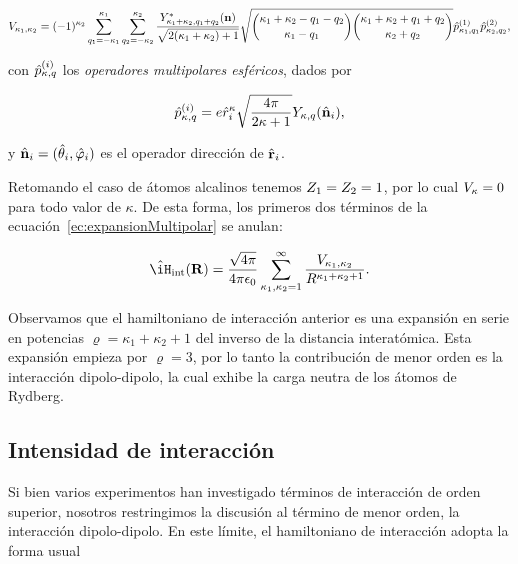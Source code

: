 \begin{equation}
\label{ec:matrizPotencial}
V_{\kappa_{1},\kappa_{2}}=(-1)^{\kappa_{2}}\sum_{q_{1}=-\kappa_{1}}^{\kappa_{1}}\sum_{q_{2}=-\kappa_{2}}^{\kappa_{2}}\frac{Y_{\kappa_{1}+\kappa_{2},q_{1}+q_{2}}^{*}(\text{\textbf{n}})}{\sqrt{2(\kappa
_{1}+\kappa_{2})+1}}\sqrt{\binom{\kappa_{1}+\kappa_{2}-q_{1}-q_{2}}{\kappa_{1}-q_{1}}\binom{\kappa_{1}+\kappa_{2}+q_{1}+q_{2}}{\kappa_{2}+q_{2}}}\hat{p}_{\kappa_{1},q_{1}}^{(1)}\hat{p}_{\kappa_{2},q_{2}}^{(2)},
\end{equation}

con $\hat{p}_{\kappa,q}^{(i)}$ los \emph{operadores multipolares esféricos}, dados por

\begin{equation}
\label{ec:operadorMultipolarEsferico}
\hat{p}_{\kappa,q}^{(i)}=e\hat{r}_{i}^{\kappa}\sqrt{\frac{4\pi}{2\kappa+1}}Y_{\kappa,q}(\hat{\text{\textbf{n}}}_{i}),
\end{equation}

y $\hat{\text{\textbf{n}}}_{i}=(\hat{\theta}_{i},\hat{\varphi}_{i})$ es el operador dirección de $\hat{\text{\textbf{r}}}_{i}$.

\p Retomando el caso de átomos alcalinos tenemos $Z_{1}=Z_{2}=1$, por lo cual $V_{\kappa}=0$ para todo valor de $\kappa$. De esta forma, los primeros dos términos de la ecuación~\ref{ec:expansionMultipolar} se anulan:

\begin{equation}
\label{ec:expansionMultipolarAlcalinos}
\hat{\iH}_\sm{\text{int}}(\vektor{R})=\frac{\sqrt{4\pi}}{4\pi\epsilon_\sm{0}}\sum_{\kappa_{1},\kappa_{2}=1}^{\infty}\frac{V_\sm{\kappa_{1},\kappa_{2}}}{R^{\kappa_{1}+\kappa_{2}+1}}.
\end{equation}

Observamos que el hamiltoniano de interacción anterior es una expansión en serie en potencias $\varrho=\kappa_{1}+\kappa_{2}+1$ del inverso de la distancia interatómica. Esta expansión empieza por $\varrho=3$, por lo tanto la contribución de menor orden es la interacción dipolo-dipolo, la cual exhibe la carga neutra de los átomos de Rydberg.

\subsection{\label{sub:intensidadInteraccion}Intensidad de interacción}

Si bien varios experimentos han investigado términos de interacción de orden superior, nosotros restringimos la discusión al término de menor orden, la interacción dipolo-dipolo. En este límite, el hamiltoniano de interacción adopta la forma usual

